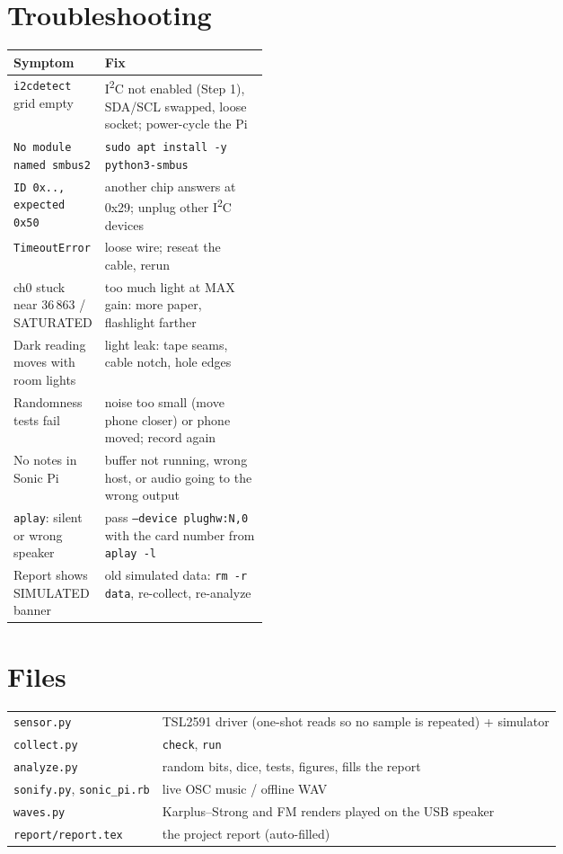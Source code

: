 \documentclass[11pt]{article}
\begin{document}
\section*{Troubleshooting}
\small
\begin{tabularx}{\linewidth}{@{}>{\raggedright\arraybackslash}p{0.33\linewidth} X@{}}
\toprule
Symptom & Fix \\
\midrule
\texttt{i2cdetect} grid empty & I\textsuperscript{2}C not enabled (Step 1), SDA/SCL swapped, loose socket; power-cycle the Pi \\
\texttt{No module named smbus2} & \texttt{sudo apt install -y python3-smbus} \\
\texttt{ID 0x.., expected 0x50} & another chip answers at 0x29; unplug other I\textsuperscript{2}C devices \\
\texttt{TimeoutError} & loose wire; reseat the cable, rerun \\
ch0 stuck near 36\,863 / SATURATED & too much light at MAX gain: more paper, flashlight farther \\
Dark reading moves with room lights & light leak: tape seams, cable notch, hole edges \\
Randomness tests fail & noise too small (move phone closer) or phone moved; record again \\
No notes in Sonic Pi & buffer not running, wrong host, or audio going to the wrong output \\
\texttt{aplay}: silent or wrong speaker & pass \texttt{--device plughw:N,0} with the card number from \texttt{aplay -l} \\
Report shows SIMULATED banner & old simulated data: \texttt{rm -r data}, re-collect, re-analyze \\
\bottomrule
\end{tabularx}

\normalsize
\section*{Files}
\begin{tabularx}{\linewidth}{@{}l X@{}}
\texttt{sensor.py} & TSL2591 driver (one-shot reads so no sample is repeated) + simulator \\
\texttt{collect.py} & \texttt{check}, \texttt{run} \\
\texttt{analyze.py} & random bits, dice, tests, figures, fills the report \\
\texttt{sonify.py}, \texttt{sonic\_pi.rb} & live OSC music / offline WAV \\
\texttt{waves.py} & Karplus--Strong and FM renders played on the USB speaker \\
\texttt{report/report.tex} & the project report (auto-filled) \\
\end{tabularx}
\end{document}
